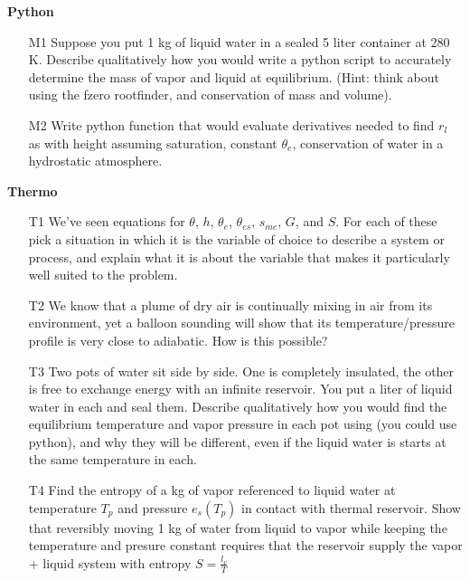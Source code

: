 \documentclass[12pt]{article}
\begin{document}
\textbf{Python}

\begin{enumerate}
\item[M1]  Suppose you put 1 kg of liquid water in a sealed 5 liter container 
at 280 K.  Describe qualitatively how you would write a python
script to  accurately determine the mass of vapor and liquid at
equilibrium.  (Hint:  think about using the fzero rootfinder, and
conservation of mass and volume).


\item[M2] Write python function that would evaluate derivatives needed to
find  $r_l$ as with height assuming saturation, constant $\theta_e$,
conservation of water in a hydrostatic atmosphere.


\end{enumerate}

\textbf{Thermo}

\begin{enumerate}
\item[T1]  We've seen equations for $\theta$, $h$, $\theta_e$, $\theta_{es}$, $s_{me}$, $G$,
and $S$.  For each of these pick a situation in which it is the variable of choice to
describe a system or process, and explain what it is about the variable that makes it
particularly well suited to the problem.


\item[T2]  We know that a plume of dry air is continually mixing in air from its environment,
yet a balloon sounding will show that its temperature/pressure profile is very close
to adiabatic.  How is this possible?

\item[T3]  Two pots of water sit side by side.  One is completely
insulated, the other is free to exchange energy with an
infinite reservoir.  You put a liter of liquid water in each and
seal them.   Describe qualitatively how you would find the
equilibrium temperature and vapor pressure in each pot using
(you could use python), and why they will be different, even if
the liquid water is starts at the same temperature in each.


\item[T4] Find the entropy of a kg of vapor
referenced to liquid water  at temperature $T_p$ and pressure $e_s(T_p)$ in
contact with thermal reservoir.  Show that reversibly moving 1 kg
of water from liquid to vapor while keeping the temperature
and presure constant requires that the reservoir supply
the vapor + liquid system with entropy $S=\frac{ l_v}{T}$



\end{enumerate}
\end{document}
